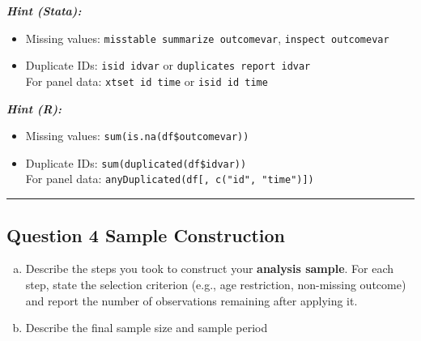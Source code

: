 \documentclass[paper=a4, fontsize=11pt]{scrartcl}
\newcommand{\horrule}[1]{\rule{\linewidth}{#1}}
\begin{document}
\medskip
\textit{\textbf{Hint (Stata):}}
\begin{itemize}
  \item Missing values: \texttt{misstable summarize outcomevar}, \texttt{inspect outcomevar}
  \item Duplicate IDs: \texttt{isid idvar} or \texttt{duplicates report idvar} \\
        For panel data: \texttt{xtset id time} or \texttt{isid id time}
\end{itemize}

\textit{\textbf{Hint (R):}}
\begin{itemize}
  \item Missing values: \texttt{sum(is.na(df\$outcomevar))}
  \item Duplicate IDs: \texttt{sum(duplicated(df\$idvar))} \\
        For panel data: \texttt{anyDuplicated(df[, c("id", "time")])}
\end{itemize}

\bigskip\horrule{0.4pt}\bigskip


\subsection*{Question 4 \quad Sample Construction}

\begin{enumerate}[(a)]
  \item Describe the steps you took to construct your \textbf{analysis sample}. For each step, state the selection criterion (e.g., age restriction, non-missing outcome) and report the number of observations remaining after applying it.
  \item Describe the final sample size and sample period
  
\end{enumerate}
\end{document}
